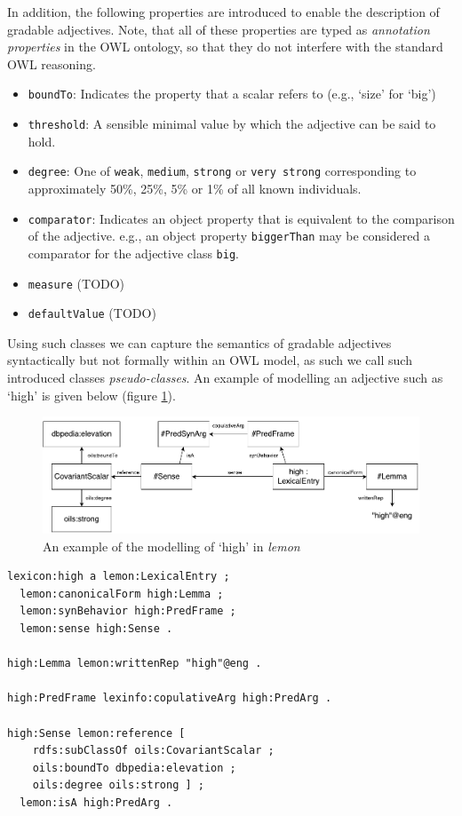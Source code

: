 \documentclass[11pt]{article}
\begin{document}
In addition, the following properties are introduced to enable the description 
of gradable adjectives. Note, that all of these properties are typed as 
\emph{annotation properties} in the OWL ontology, so that they do not interfere 
with the standard OWL reasoning.

\begin{itemize}
	\item {\tt boundTo}: Indicates the property that a scalar refers to (e.g., `size' for `big')
	\item {\tt threshold}: A sensible minimal value by which the adjective can be said to hold.
	\item {\tt degree}: One of {\tt weak}, {\tt medium}, {\tt strong} or {\tt very strong} corresponding to approximately 50\%, 25\%, 5\% or 1\% of all known individuals.
	\item {\tt comparator}: Indicates an object property that is equivalent to the comparison of the adjective. e.g., an object property {\tt biggerThan} may be considered a comparator for the adjective class {\tt big}.
	\item {\tt measure} (TODO)
	\item {\tt defaultValue} (TODO)
\end{itemize}

Using such classes we can capture the semantics of gradable adjectives 
syntactically but not formally within an OWL model, as such we call such 
introduced classes \emph{pseudo-classes}. An example of modelling an adjective 
such as `high' is given below (figure \ref{high-example}).

\begin{figure}
\includegraphics[width=\textwidth]{high-example}
\caption{An example of the modelling of `high' in \emph{lemon}\label{high-example}}
\end{figure}

\begin{verbatim}
lexicon:high a lemon:LexicalEntry ;
  lemon:canonicalForm high:Lemma ;
  lemon:synBehavior high:PredFrame ;
  lemon:sense high:Sense .

high:Lemma lemon:writtenRep "high"@eng .

high:PredFrame lexinfo:copulativeArg high:PredArg .

high:Sense lemon:reference [
    rdfs:subClassOf oils:CovariantScalar ;
    oils:boundTo dbpedia:elevation ;
    oils:degree oils:strong ] ;
  lemon:isA high:PredArg .
\end{verbatim}
\end{document}
